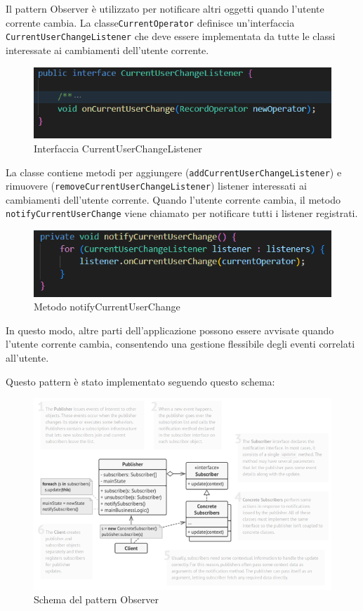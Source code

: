 Il pattern Observer è utilizzato per notificare altri oggetti quando l'utente corrente cambia. La classe\texttt{CurrentOperator} definisce un'interfaccia \texttt{CurrentUserChangeListener}
che deve essere implementata da tutte le classi interessate ai cambiamenti dell'utente corrente.
\begin{figure}[H]
    \centering
    \includegraphics[width=1\textwidth]{img/currentUserChangeListener.png}
    \caption{Interfaccia CurrentUserChangeListener}
    \label{fig:Observer 1}
\end{figure}
La classe contiene metodi per aggiungere (\texttt{addCurrentUserChangeListener}) e rimuovere (\texttt{removeCurrentUserChangeListener}) listener interessati ai cambiamenti dell'utente corrente.
Quando l'utente corrente cambia, il metodo \texttt{notifyCurrentUserChange} viene chiamato per notificare tutti i listener registrati.
\begin{figure}[H]
    \centering
    \includegraphics[width=1\textwidth]{img/notifyCurrentUserChange.png}
    \caption{Metodo notifyCurrentUserChange}
    \label{fig:Observer 2}
\end{figure}
In questo modo, altre parti dell'applicazione possono essere avvisate quando l'utente corrente cambia, consentendo una gestione flessibile degli eventi correlati all'utente.

Questo pattern è stato implementato seguendo questo schema:
\begin{figure}[H]
    \centering
    \includegraphics[width=1\textwidth]{img/schema_observer.png}
    \caption{Schema del pattern Observer}
    \label{fig:ObserverPattern}
\end{figure}